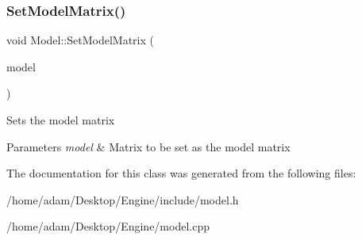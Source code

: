 \subsubsection{\texorpdfstring{Set\+Model\+Matrix()}{SetModelMatrix()}}
{\footnotesize\ttfamily void Model\+::\+Set\+Model\+Matrix (\begin{DoxyParamCaption}\item[{Eigen\+::\+Matrix$<$ G\+Lfloat, 4, 4 $>$}]{model }\end{DoxyParamCaption})}

Sets the model matrix 
\begin{DoxyParams}{Parameters}
{\em model} & Matrix to be set as the model matrix \\
\hline
\end{DoxyParams}


The documentation for this class was generated from the following files\+:\begin{DoxyCompactItemize}
\item 
/home/adam/\+Desktop/\+Engine/include/model.\+h\item 
/home/adam/\+Desktop/\+Engine/model.\+cpp\end{DoxyCompactItemize}
